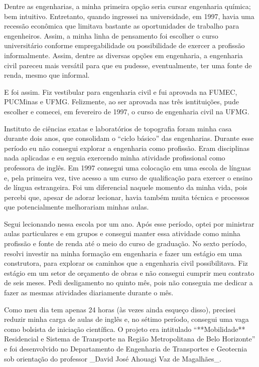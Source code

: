 \documentclass[
]{book}
\begin{document}
Dentre as engenharias, a minha primeira opção seria cursar engenharia química; bem intuitivo. Entretanto, quando ingressei na universidade, em 1997, havia uma recessão econômica que limitava bastante as oportunidades de trabalho para engenheiros. Assim, a minha linha de pensamento foi escolher o curso universitário conforme empregabilidade ou possibilidade de exercer a profissão informalmente. Assim, dentre as diversas opções em engenharia, a engenharia civil pareceu mais versátil para que eu pudesse, eventualmente, ter uma fonte de renda, mesmo que informal.

E foi assim. Fiz vestibular para engenharia civil e fui aprovada na FUMEC, PUCMinas e UFMG. Felizmente, ao ser aprovada nas três isntituições, pude escolher e comecei, em fevereiro de 1997, o curso de engenharia civil na UFMG.

Instituto de ciências exatas e laboratórios de topografia foram minha casa durante dois anos, que consolidam o ``ciclo básico'' das engenharias. Durante esse período eu não consegui explorar a engenharia como profissão. Eram disciplinas nada aplicadas e eu seguia exercendo minha atividade profissional como professora de inglês. Em 1997 consegui uma colocação em uma escola de línguas e, pela primeira vez, tive acesso a um curso de qualificação para exercer o ensino de língua estrangeira. Foi um diferencial naquele momento da minha vida, pois percebi que, apesar de adorar lecionar, havia também muita técnica e processos que potencialmente melhorariam minhas aulas.

Segui lecionando nessa escola por um ano. Após esse período, optei por ministrar aulas particulares e em grupos e consegui manter essa atividade como minha profissão e fonte de renda até o meio do curso de graduação. No sexto período, resolvi investir na minha formação em engenharia e fazer um estágio em uma construtora, para explorar os caminhos que a engenharia civil possibilitava. Fiz estágio em um setor de orçamento de obras e não consegui cumprir meu contrato de seis meses. Pedi desligamento no quinto mês, pois não conseguia me dedicar a fazer as mesmas atividades diariamente durante o mês.

Como meu dia tem apenas 24 horas (às vezes ainda esqueço disso), precisei reduzir minha carga de aulas de inglês e, no sétimo período, consegui uma vaga como bolsista de iniciação científica. O projeto era intitulado ``**Mobilidade** Residencial e Sistema de Transporte na Região Metropolitana de Belo Horizonte'' e foi desenvolvido no Departamento de Engenharia de Transportes e Geotecnia sob orientação do professor \_David José Ahouagi Vaz de Magalhães\_.
\end{document}
